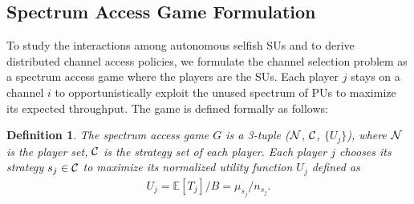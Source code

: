 \documentclass[12pt, onecolumn]{IEEEtran}
\theoremstyle{plain}
\newtheorem{definition}{Definition}
\theoremstyle{definition}
\begin{document}
\begin{comment}

\begin{itemize}
	\item Collision model: in this simplified model, if more than one SU accesses the same channel $i$, there is a collision, in this model, we have
\begin{eqnarray*}
f(\mu_i, n_i)=
\begin{cases}
B\mu_i & n_i=1 \\
0 & n_i\ge 2
\end{cases}.
\end{eqnarray*}
	\item Random access model: in this model, the SUs implement a  random access protocol to avoid collisions, such as Aloha and CSMA based MAC protocols or their variants, in this case, we have
\begin{eqnarray*}
f(\mu_i, n_i)=B\mu_ip(n_i),
\end{eqnarray*}
where $p_i(n_i)$ denotes the successful transmission probability with $n_i$ SUs on the same channel $i$. Note that $p_i(n_i)$ can be derived from the Markov chain model of the protocol used (e.g.,~\cite{Bianchi00}).
\end{itemize}

\end{comment}


\subsection{Spectrum Access Game Formulation}
\label{subsec:congestion_game}

To study the interactions among autonomous selfish SUs and to derive distributed channel access policies, we formulate the channel selection problem as a spectrum access game where the players are the SUs. Each player $j$ stays on a channel $i$ to opportunistically exploit the unused spectrum of PUs to maximize its expected throughput.
The game is defined formally as follows:

\begin{definition}
The spectrum access game $G$ is a 3-tuple ($\cal N$, $\cal C$, $\{U_j\}$), where $\cal N$ is the player set, $\cal C$
is the strategy set of each player. Each player $j$ chooses its strategy $s_j\in{\cal C}$
to maximize its normalized utility function $U_j$ defined as
\begin{eqnarray*}
U_j=\mathbb{E}[T_j]/B=\mu_{s_j}/n_{s_j}.
\end{eqnarray*}
\end{definition}
\end{document}
